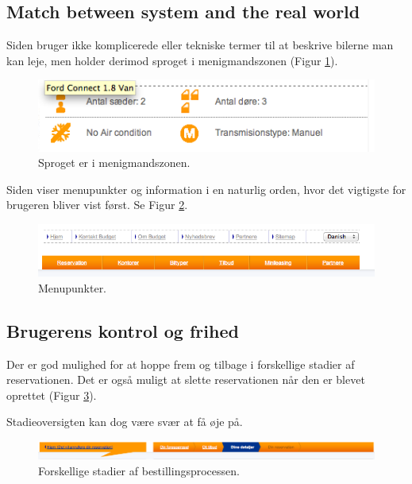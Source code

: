 \documentclass[a4paper]{article}
\begin{document}
\subsection{Match between system and the real world}
Siden bruger ikke komplicerede eller tekniske termer til at beskrive bilerne man
kan leje, men holder derimod sproget i menigmandszonen (Figur \ref{sprog}).

\begin{figure}[htbp]
  \begin{center}
    \includegraphics[scale=.6]{5.png}
  \end{center}
  \caption{Sproget er i menigmandszonen.}
  \label{sprog}
\end{figure}

Siden viser menupunkter og information i en naturlig orden, hvor det vigtigste
for brugeren bliver vist først. Se Figur \ref{menu}.

\begin{figure}[htbp]
  \begin{center}
    \includegraphics[width=\textwidth]{2.png}
  \end{center}
  \caption{Menupunkter.}
  \label{menu}
\end{figure}

\subsection{Brugerens kontrol og frihed}
Der er god mulighed for at hoppe frem og tilbage i forskellige stadier af
reservationen. Det er også muligt at slette reservationen når den er blevet
oprettet (Figur \ref{stadier}).

Stadieoversigten kan dog være svær at få øje på.
\begin{figure}[htbp]
  \begin{center}
    \includegraphics[width=\textwidth]{9.png}
  \end{center}
  \caption{Forskellige stadier af bestillingsprocessen.}
  \label{stadier}
\end{figure}
\end{document}
